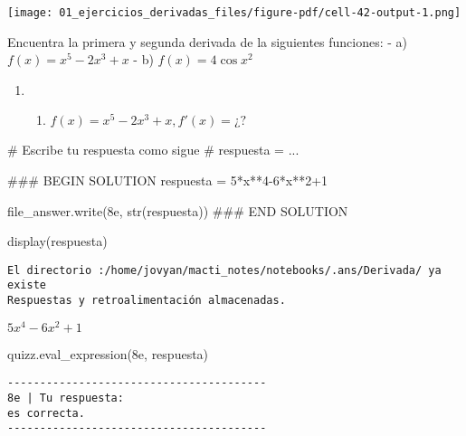 \documentclass[
  letterpaper,
  DIV=11,
  numbers=noendperiod]{scrreprt}
\newenvironment{Shaded}{\begin{snugshade}}{\end{snugshade}}
\newcommand{\BuiltInTok}[1]{\textcolor[rgb]{0.00,0.23,0.31}{#1}}
\newcommand{\CommentTok}[1]{\textcolor[rgb]{0.37,0.37,0.37}{#1}}
\newcommand{\DecValTok}[1]{\textcolor[rgb]{0.68,0.00,0.00}{#1}}
\newcommand{\NormalTok}[1]{\textcolor[rgb]{0.00,0.23,0.31}{#1}}
\newcommand{\OperatorTok}[1]{\textcolor[rgb]{0.37,0.37,0.37}{#1}}
\newcommand{\RegionMarkerTok}[1]{\textcolor[rgb]{0.00,0.23,0.31}{#1}}
\newcommand{\StringTok}[1]{\textcolor[rgb]{0.13,0.47,0.30}{#1}}
\providecommand{\tightlist}{%
  \setlength{\itemsep}{0pt}\setlength{\parskip}{0pt}}\usepackage{longtable,booktabs,array}
\begin{document}
\texttt{[image: 01\_ejercicios\_derivadas\_files/figure-pdf/cell-42-output-1.png]}

Encuentra la primera y segunda derivada de la siguientes funciones: - a)
\(f(x)= x^5 - 2x^3 + x\) - b) \(f(x)= 4 \cos x^2\)

\begin{enumerate}
\def\labelenumi{\arabic{enumi}.}
\setcounter{enumi}{7}
\tightlist
\item
  \begin{enumerate}
  \def\labelenumii{\alph{enumii}.}
  \setcounter{enumii}{4}
  \tightlist
  \item
    \(f(x) = x^5 - 2x^3 + x, f'(x) = ¿?\)
  \end{enumerate}
\end{enumerate}

\begin{Shaded}
\begin{Highlighting}[]
\CommentTok{\# Escribe tu respuesta como sigue }
\CommentTok{\# respuesta = ...}

\CommentTok{\#\#\# }\RegionMarkerTok{BEGIN}\CommentTok{ SOLUTION}
\NormalTok{respuesta }\OperatorTok{=} \DecValTok{5}\OperatorTok{*}\NormalTok{x}\OperatorTok{**}\DecValTok{4}\OperatorTok{{-}}\DecValTok{6}\OperatorTok{*}\NormalTok{x}\OperatorTok{**}\DecValTok{2}\OperatorTok{+}\DecValTok{1}

\NormalTok{file\_answer.write(}\StringTok{\textquotesingle{}8e\textquotesingle{}}\NormalTok{, }\BuiltInTok{str}\NormalTok{(respuesta))}
\CommentTok{\#\#\# }\RegionMarkerTok{END}\CommentTok{ SOLUTION}

\NormalTok{display(respuesta)}
\end{Highlighting}
\end{Shaded}

\begin{verbatim}
El directorio :/home/jovyan/macti_notes/notebooks/.ans/Derivada/ ya existe
Respuestas y retroalimentación almacenadas.
\end{verbatim}

$\displaystyle 5 x^{4} - 6 x^{2} + 1$

\begin{Shaded}
\begin{Highlighting}[]
\NormalTok{quizz.eval\_expression(}\StringTok{\textquotesingle{}8e\textquotesingle{}}\NormalTok{, respuesta)}
\end{Highlighting}
\end{Shaded}

\begin{verbatim}
----------------------------------------
8e | Tu respuesta:
es correcta.
----------------------------------------
\end{verbatim}
\end{document}
